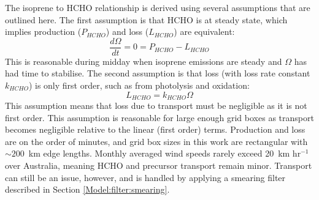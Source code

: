 \documentclass[acp, manuscript]{copernicus}
\begin{document}
    The isoprene to HCHO relationship is derived using several assumptions that are outlined here.
    The first assumption is that HCHO is at steady state, which implies production ($P_{HCHO}$) and loss ($L_{HCHO}$) are equivalent:
    \begin{equation}
      \label{BioIsop:method:slope:eqn_steady_state]}
      \frac{d \Omega }{dt} = 0 = P_{HCHO} - L_{HCHO}
    \end{equation}
    This is reasonable during midday when isoprene emissions are steady and $\Omega$ has had time to stabilise.
    The second assumption is that loss (with loss rate constant $k_{HCHO}$) is only first order, such as from photolysis and oxidation:
    \begin{equation}
      \label{BioIsop:method:slope:eqn_loss}
      L_{HCHO}  = k_{HCHO} \Omega %
    \end{equation}
    This assumption means that loss due to transport must be negligible as it is not first order.
    This assumption is reasonable for large enough grid boxes as transport becomes negligible relative to the linear (first order) terms.
    Production and loss are on the order of minutes, and grid box sizes in this work are rectangular with $\sim 200$~km edge lengths.
    Monthly averaged wind speeds rarely exceed 20~km hr$^{-1}$ over Australia, meaning HCHO and precursor transport remain minor.
    Transport can still be an issue, however, and is handled by applying a smearing filter described in Section \ref{Model:filter:smearing}.
    
\end{document}
